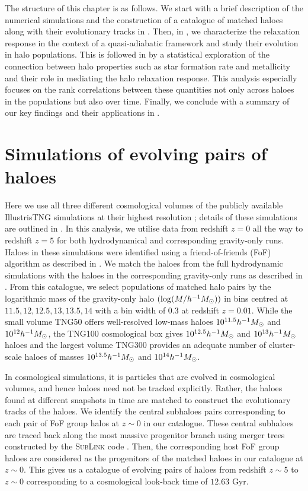 The structure of this chapter is as follows. We start with a brief description of the numerical simulations and the construction of a catalogue of matched haloes along with their evolutionary tracks in . Then, in , we characterize the relaxation response in the context of a quasi-adiabatic framework and study their evolution in halo populations. This is followed in  by a statistical exploration of the connection between halo properties such as star formation rate and metallicity and their role in mediating the halo relaxation response. This analysis especially focuses on the rank correlations between these quantities not only across haloes in the populations but also over time. Finally, we conclude with a summary of our key findings and their applications in .


\section{Simulations of evolving pairs of haloes}
\label{sec:simhals}
Here we use all three different cosmological volumes of the publicly available IllustrisTNG simulations at their highest resolution \citep{2019ComAC...6....2N}; details of these simulations are outlined in . In this analysis, we utilise data from redshift $z=0$ all the way to redshift $z=5$ for both hydrodynamical and corresponding gravity-only runs. Haloes in these simulations were identified using a friend-of-friends (FoF) algorithm as described in . We match the haloes from the full hydrodynamic simulations with the haloes in the corresponding gravity-only runs as described in . From this catalogue, we select populations of matched halo pairs by the logarithmic mass of the gravity-only halo $(\log(M/h^{-1}M_{\odot}))$ in bins centred at $11.5, 12, 12.5, 13, 13.5, 14$ with a bin width of 0.3 at redshift $z=0.01$. While the small volume TNG50 offers well-resolved low-mass haloes $10^{11.5} h^{-1}M_{\odot}$ and $10^{12} h^{-1}M_{\odot}$, the TNG100 cosmological box gives $10^{12.5} h^{-1}M_{\odot}$ and $10^{13} h^{-1}M_{\odot}$ haloes and the largest volume TNG300 provides an adequate number of cluster-scale haloes of masses $10^{13.5} h^{-1}M_{\odot}$ and $10^{14} h^{-1}M_{\odot}$. 

In cosmological simulations, it is particles that are evolved in cosmological volumes, and hence haloes need not be tracked explicitly. Rather, the haloes found at different snapshots in time are matched to construct the evolutionary tracks of the haloes. We identify the central subhaloes pairs corresponding to each pair of FoF group halos at $z\sim 0$ in our catalogue. These central subhaloes are traced back along the most massive progenitor branch using merger trees constructed by the \textsc{SubLink} code \citep{2015RodriguezGeneletalSubLink}. Then, the corresponding host FoF group haloes are considered as the progenitors of the matched haloes in our catalogue at $z \sim 0$. This gives us a catalogue of evolving pairs of haloes from redshift $z \sim 5$ to $z \sim 0$ corresponding to a cosmological look-back time of $12.63$ Gyr.

